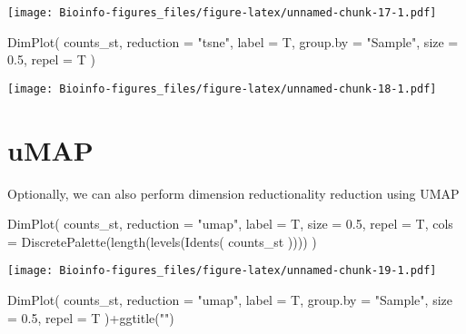 \documentclass[
  openany]{book}
\newenvironment{Shaded}{\begin{snugshade}}{\end{snugshade}}
\newcommand{\AttributeTok}[1]{\textcolor[rgb]{0.77,0.63,0.00}{#1}}
\newcommand{\FloatTok}[1]{\textcolor[rgb]{0.00,0.00,0.81}{#1}}
\newcommand{\FunctionTok}[1]{\textcolor[rgb]{0.00,0.00,0.00}{#1}}
\newcommand{\NormalTok}[1]{#1}
\newcommand{\SpecialCharTok}[1]{\textcolor[rgb]{0.00,0.00,0.00}{#1}}
\newcommand{\StringTok}[1]{\textcolor[rgb]{0.31,0.60,0.02}{#1}}
\begin{document}
\texttt{[image: Bioinfo-figures\_files/figure-latex/unnamed-chunk-17-1.pdf]}

\begin{Shaded}
\begin{Highlighting}[]
\FunctionTok{DimPlot}\NormalTok{(}
\NormalTok{  counts\_st,}
  \AttributeTok{reduction =} \StringTok{"tsne"}\NormalTok{,}
  \AttributeTok{label =}\NormalTok{ T,}
  \AttributeTok{group.by =} \StringTok{"Sample"}\NormalTok{,}
  \AttributeTok{size =} \FloatTok{0.5}\NormalTok{,}
  \AttributeTok{repel =}\NormalTok{ T}
\NormalTok{)}
\end{Highlighting}
\end{Shaded}

\texttt{[image: Bioinfo-figures\_files/figure-latex/unnamed-chunk-18-1.pdf]}

\clearpage

\hypertarget{umap}{%
\section{uMAP}\label{umap}}

Optionally, we can also perform dimension reductionality reduction using UMAP

\begin{Shaded}
\begin{Highlighting}[]
\FunctionTok{DimPlot}\NormalTok{(}
\NormalTok{  counts\_st,}
  \AttributeTok{reduction =} \StringTok{"umap"}\NormalTok{,}
  \AttributeTok{label =}\NormalTok{ T,}
  \AttributeTok{size =} \FloatTok{0.5}\NormalTok{,}
  \AttributeTok{repel =}\NormalTok{ T,}
  \AttributeTok{cols =} \FunctionTok{DiscretePalette}\NormalTok{(}\FunctionTok{length}\NormalTok{(}\FunctionTok{levels}\NormalTok{(}\FunctionTok{Idents}\NormalTok{(}
\NormalTok{    counts\_st}
\NormalTok{  ))))}
\NormalTok{)}
\end{Highlighting}
\end{Shaded}

\texttt{[image: Bioinfo-figures\_files/figure-latex/unnamed-chunk-19-1.pdf]}

\begin{Shaded}
\begin{Highlighting}[]
\FunctionTok{DimPlot}\NormalTok{(}
\NormalTok{  counts\_st,}
  \AttributeTok{reduction =} \StringTok{"umap"}\NormalTok{,}
  \AttributeTok{label =}\NormalTok{ T,}
  \AttributeTok{group.by =} \StringTok{"Sample"}\NormalTok{,}
  \AttributeTok{size =} \FloatTok{0.5}\NormalTok{,}
  \AttributeTok{repel =}\NormalTok{ T}
\NormalTok{)}\SpecialCharTok{+}\FunctionTok{ggtitle}\NormalTok{(}\StringTok{""}\NormalTok{)}
\end{Highlighting}
\end{Shaded}
\end{document}
